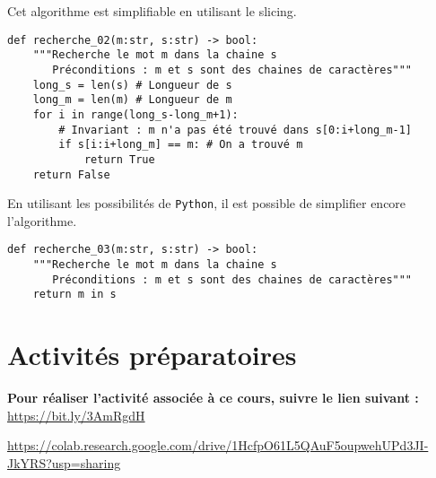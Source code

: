 \documentclass[t,10pt]{article}
\begin{document}
Cet algorithme est simplifiable en utilisant le slicing.
\begin{lstlisting}
def recherche_02(m:str, s:str) -> bool:
    """Recherche le mot m dans la chaine s
       Préconditions : m et s sont des chaines de caractères"""
    long_s = len(s) # Longueur de s
    long_m = len(m) # Longueur de m
    for i in range(long_s-long_m+1): 
        # Invariant : m n'a pas été trouvé dans s[0:i+long_m-1]
        if s[i:i+long_m] == m: # On a trouvé m
            return True
    return False
\end{lstlisting}

En utilisant les possibilités de \texttt{Python}, il est possible de simplifier encore l'algorithme. 

\begin{lstlisting}
def recherche_03(m:str, s:str) -> bool:
    """Recherche le mot m dans la chaine s
       Préconditions : m et s sont des chaines de caractères"""
    return m in s
\end{lstlisting}

\section{Activités préparatoires}


\textbf{Pour réaliser l'activité associée à ce cours, suivre le lien suivant : }
\url{https://bit.ly/3AmRgdH}

\url{https://colab.research.google.com/drive/1HcfpO61L5QAuF5oupwehUPd3JI-JkYRS?usp=sharing}


\end{document}
